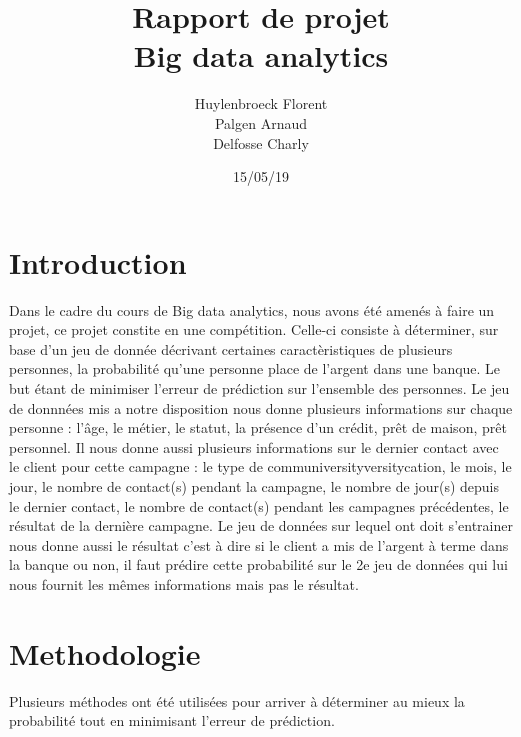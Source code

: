 \documentclass[11pt]{article}
\title{Rapport de projet \\Big data analytics}
\author{Huylenbroeck Florent
		\\Palgen Arnaud
		\\Delfosse Charly}
\date{15/05/19}
\begin{document}
	
	\maketitle
	\newpage
	
	\section{Introduction}
	Dans le cadre du cours de Big data analytics, nous avons été amenés à faire un projet, ce projet constite en une compétition. Celle-ci consiste à déterminer, sur base d'un jeu de donnée décrivant certaines caractèristiques de plusieurs personnes, la probabilité qu'une personne place de l'argent dans une banque. Le but étant de minimiser l'erreur de prédiction sur l'ensemble des personnes. Le jeu de donnnées mis a notre disposition nous donne plusieurs informations sur chaque personne : l'âge, le métier, le statut, la présence d'un crédit, prêt de maison, prêt personnel. Il nous donne aussi plusieurs informations sur le dernier contact avec le client pour cette campagne : le type de communiversityversitycation, le mois, le jour, le nombre de contact(s) pendant la campagne, le nombre de jour(s) depuis le dernier contact, le nombre de contact(s) pendant les campagnes précédentes, le résultat de la dernière campagne. Le jeu de données sur lequel ont doit s'entrainer nous donne aussi le résultat c'est à dire si le client a mis de l'argent à terme dans la banque ou non, il faut prédire cette probabilité sur le 2e jeu de données qui lui nous fournit les mêmes informations mais pas le résultat. 
	
	\section{Methodologie}
	
	Plusieurs méthodes ont été utilisées pour arriver à déterminer au mieux la probabilité tout en minimisant l'erreur de prédiction. 
\end{document}
